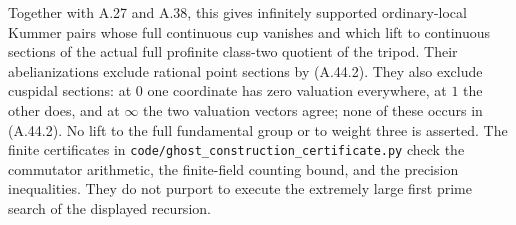 Together with A.27 and A.38, this gives infinitely
supported ordinary-local Kummer pairs whose full
continuous cup vanishes and which lift to continuous
sections of the actual full profinite class-two
quotient of the tripod. Their abelianizations exclude
rational point sections by (A.44.2). They also exclude
cuspidal sections: at $0$ one coordinate has zero
valuation everywhere, at $1$ the other does, and at
$\infty$ the two valuation vectors agree; none of
these occurs in (A.44.2). No lift to the full
fundamental group or to weight three is asserted.
The finite certificates in
\texttt{code/ghost\_construction\_certificate.py}
check the commutator arithmetic, the finite-field
counting bound, and the precision inequalities.
They do not purport to execute the extremely large
first prime search of the displayed recursion.
